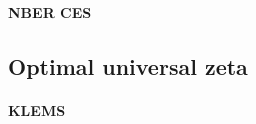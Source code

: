 \documentclass[11pt]{article}
\begin{document}

\paragraph{NBER CES}




\subsection{Optimal universal zeta}
\label{sect_zeta_minimal_bias}

\paragraph{KLEMS}
\end{document}
